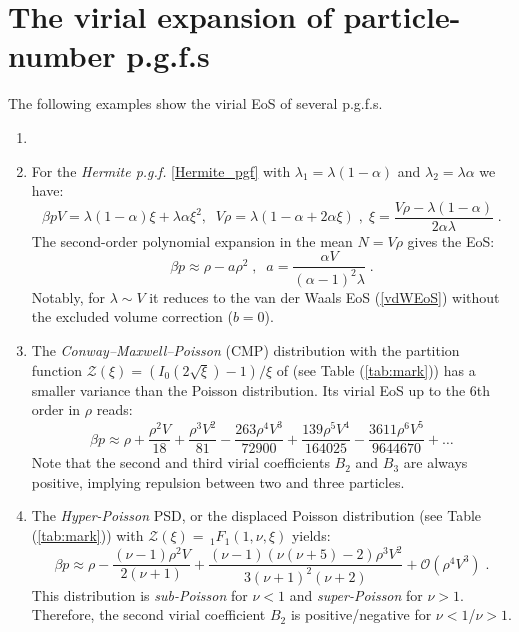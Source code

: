 \documentclass[a4paper,12pt]{amsart}
\theoremstyle{definition}
\theoremstyle{remark}
\begin{document}
\section{The virial expansion of particle-number p.g.f.{}s}\label{ExEoS}
The following examples show the virial EoS of several p.g.f.{}s.
\begin{enumerate}[label=(\roman*), leftmargin=*]
\item[]
\item For the {\it Hermite p.g.f.} \ref{Hermite_pgf} with $\lambda_1=\lambda(1-\alpha)$ and $\lambda_2=\lambda\alpha$ we have:
\[
\beta pV=\lambda(1-\alpha)\xi +\lambda \alpha \xi^2,\;\; V\rho=\lambda(1-\alpha+2\alpha \xi)\;,\; \xi=\frac{V \rho -\lambda(1-\alpha)}{2\alpha\lambda}\;.
\]
The second-order polynomial expansion in the mean $N = V\rho$ gives the EoS:
\begin{equation}\label{HermEoS}
 \beta p \approx \rho-a\rho^2\;,\;\; a=\frac{\alpha V}{(\alpha-1)^2 \lambda }\;.   
\end{equation} 
 Notably, for $\lambda\sim V$ it reduces to the van der Waals EoS (\ref{vdWEoS}) without the excluded volume correction ($b=0$). 
\item The {\it Conway–Maxwell–Poisson} (CMP) distribution with the partition function 
$\mathcal{Z}(\xi)=(I_0\left(2 \sqrt{\xi }\right)-1)/\xi$ of (see Table (\ref{tab:mark})) has a smaller variance than the Poisson distribution. Its virial EoS up to the 6th order in $\rho$ reads:
\[
\beta p \approx 
\rho  +\frac{\rho ^2 V}{18}+\frac{\rho ^3 V^2}{81}
-\frac{263 \rho ^4 V^3}{72900} 
+\frac{139 \rho ^5 V^4}{164025}
-\frac{3611 \rho ^6 V^5}{9644670}+\ldots
\]
Note that the second and third virial coefficients $B_2$ and $B_3$ are always positive, implying repulsion between two and three particles.
\medskip
\item The  {\it Hyper-Poisson} PSD, or the displaced Poisson distribution (see Table (\ref{tab:mark})) with $\mathcal{Z}(\xi)=\,_1F_1(1,\nu,\xi)$ yields: 
\[ \beta p\approx \rho  
-\frac{(\nu -1) \rho ^2 V}{2 (\nu +1)}+
\frac{(\nu -1) (\nu  (\nu +5)-2) \rho ^3 V^2}{3 (\nu +1)^2 (\nu +2)}+\mathcal{O}(\rho^4V^3)\;.
\]
This distribution is {\it sub-Poisson} for $\nu<1$  and {\it super-Poisson} for $\nu>1$. Therefore, the second virial coefficient $B_2$ is positive/negative for $\nu<1$/$\nu>1$.

\end{enumerate}
\end{document}
